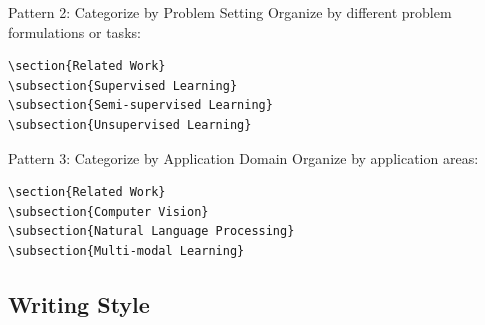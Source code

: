 \documentclass[]{fairmeta} %
\theoremstyle{plain}
\theoremstyle{definition}
\theoremstyle{remark}
\begin{document}
\begin{AIbox}{Pattern 2: Categorize by Problem Setting}
Organize by different problem formulations or tasks:

\begin{verbatim}
\section{Related Work}
\subsection{Supervised Learning}
\subsection{Semi-supervised Learning}
\subsection{Unsupervised Learning}
\end{verbatim}
\end{AIbox}

\begin{AIbox}{Pattern 3: Categorize by Application Domain}
Organize by application areas:

\begin{verbatim}
\section{Related Work}
\subsection{Computer Vision}
\subsection{Natural Language Processing}
\subsection{Multi-modal Learning}
\end{verbatim}
\end{AIbox}


\subsection{Writing Style}
\label{sec:rw-style}
\end{document}
